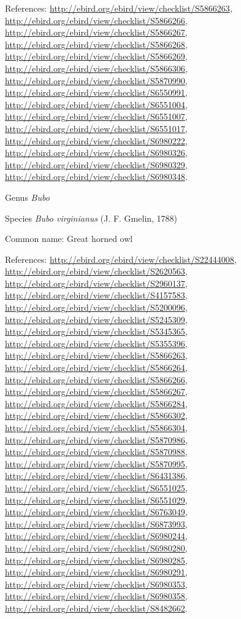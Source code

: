 \documentclass[9pt, article]{memoir}
\begin{document}
\begin{multicols}{2}
References: 
\url{http://ebird.org/ebird/view/checklist/S5866263}, 
\url{http://ebird.org/ebird/view/checklist/S5866266}, 
\url{http://ebird.org/ebird/view/checklist/S5866267}, 
\url{http://ebird.org/ebird/view/checklist/S5866268}, 
\url{http://ebird.org/ebird/view/checklist/S5866269}, 
\url{http://ebird.org/ebird/view/checklist/S5866306}, 
\url{http://ebird.org/ebird/view/checklist/S5870990}, 
\url{http://ebird.org/ebird/view/checklist/S6550991}, 
\url{http://ebird.org/ebird/view/checklist/S6551004}, 
\url{http://ebird.org/ebird/view/checklist/S6551007}, 
\url{http://ebird.org/ebird/view/checklist/S6551017}, 
\url{http://ebird.org/ebird/view/checklist/S6980222}, 
\url{http://ebird.org/ebird/view/checklist/S6980326}, 
\url{http://ebird.org/ebird/view/checklist/S6980329}, 
\url{http://ebird.org/ebird/view/checklist/S6980348}.

\vspace{6pt}\noindent\hspace{30pt}Genus \textit{Bubo}


\vspace{6pt}\noindent\hspace{36pt}Species \textit{Bubo virginianus} (J. F. Gmelin, 1788)


Common name: Great horned owl

References: 
\url{http://ebird.org/ebird/view/checklist/S22444008}, 
\url{http://ebird.org/ebird/view/checklist/S2620563}, 
\url{http://ebird.org/ebird/view/checklist/S2960137}, 
\url{http://ebird.org/ebird/view/checklist/S4157583}, 
\url{http://ebird.org/ebird/view/checklist/S5200096}, 
\url{http://ebird.org/ebird/view/checklist/S5245309}, 
\url{http://ebird.org/ebird/view/checklist/S5345365}, 
\url{http://ebird.org/ebird/view/checklist/S5355396}, 
\url{http://ebird.org/ebird/view/checklist/S5866263}, 
\url{http://ebird.org/ebird/view/checklist/S5866264}, 
\url{http://ebird.org/ebird/view/checklist/S5866266}, 
\url{http://ebird.org/ebird/view/checklist/S5866267}, 
\url{http://ebird.org/ebird/view/checklist/S5866284}, 
\url{http://ebird.org/ebird/view/checklist/S5866302}, 
\url{http://ebird.org/ebird/view/checklist/S5866304}, 
\url{http://ebird.org/ebird/view/checklist/S5870986}, 
\url{http://ebird.org/ebird/view/checklist/S5870988}, 
\url{http://ebird.org/ebird/view/checklist/S5870995}, 
\url{http://ebird.org/ebird/view/checklist/S6431386}, 
\url{http://ebird.org/ebird/view/checklist/S6551025}, 
\url{http://ebird.org/ebird/view/checklist/S6551029}, 
\url{http://ebird.org/ebird/view/checklist/S6763049}, 
\url{http://ebird.org/ebird/view/checklist/S6873993}, 
\url{http://ebird.org/ebird/view/checklist/S6980244}, 
\url{http://ebird.org/ebird/view/checklist/S6980280}, 
\url{http://ebird.org/ebird/view/checklist/S6980285}, 
\url{http://ebird.org/ebird/view/checklist/S6980291}, 
\url{http://ebird.org/ebird/view/checklist/S6980353}, 
\url{http://ebird.org/ebird/view/checklist/S6980358}, 
\url{http://ebird.org/ebird/view/checklist/S8482662}.


\end{multicols}
\end{document}
